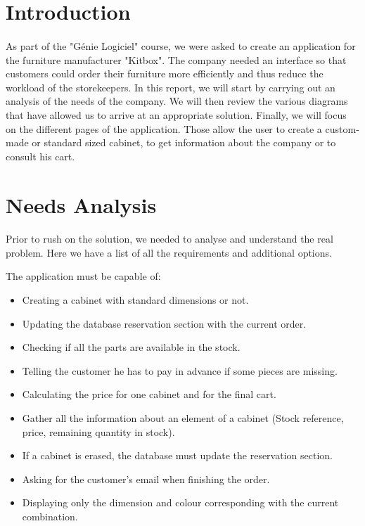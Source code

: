 \documentclass[12pt,oneside]{report}
\begin{document}
\section{Introduction}
    \paragraph{}
    As part of the "Génie Logiciel" course, we were asked to create an application for the furniture manufacturer "Kitbox". The company needed an interface so that customers could order their furniture more efficiently and thus reduce the workload of the storekeepers. In this report, we will start by carrying out an analysis of the needs of the company. We will then review the various diagrams that have allowed us to arrive at an appropriate solution. Finally, we will focus on the different pages of the application. Those allow the user to create a custom-made or standard sized cabinet, to get information about the company or to consult his cart.

\newpage
\section{Needs Analysis}
    \paragraph{} Prior to rush on the solution, we needed to analyse and understand the real problem. Here we have a list of all the requirements and additional options.
    \vspace{\baselineskip}
    
    The application must be capable of:
    \begin{itemize}
        \item Creating a cabinet with standard dimensions or not.
        \item Updating the database reservation section with the current order.
        \item Checking if all the parts are available in the stock.
        \item Telling the customer he has to pay in advance if some pieces are missing.
        \item Calculating the price for one cabinet and for the final cart.
        \item Gather all the information about an element of a cabinet (Stock reference, price, remaining quantity in stock).
        \item If a cabinet is erased, the database must update the reservation section.
        \item Asking for the customer’s email when finishing the order.
        \item Displaying only the dimension and colour corresponding with the current combination.
    \end{itemize}
    \vspace{\baselineskip}
    
\end{document}
